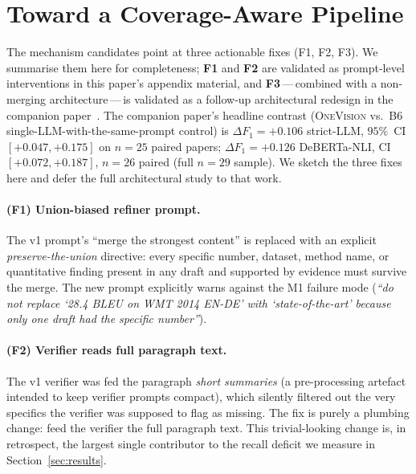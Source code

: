 \documentclass[11pt,a4paper]{article}
\begin{document}
\section{Toward a Coverage-Aware Pipeline}
\label{sec:fix}

The mechanism candidates point at three actionable fixes (F1, F2, F3).
We summarise them here for completeness; \textbf{F1} and \textbf{F2}
are validated as prompt-level interventions in this paper's appendix
material, and \textbf{F3}\,---\,combined with a non-merging
architecture\,---\,is validated as a follow-up architectural redesign
in the companion paper~\cite{sun2026onevision}. The companion paper's
headline contrast (\textsc{OneVision} vs.\ B6 single-LLM-with-the-same-prompt
control) is $\Delta F_1 = +0.106$ strict-LLM, $95\%$~CI
$[+0.047,+0.175]$ on $n=25$ paired papers; $\Delta F_1 = +0.126$
DeBERTa-NLI, CI~$[+0.072,+0.187]$, $n=26$ paired (full $n=29$
sample). We sketch the three fixes here and
defer the full architectural study to that work.

\paragraph{(F1) Union-biased refiner prompt.}
The v1 prompt's ``merge the strongest content'' is replaced with an
explicit \emph{preserve-the-union} directive: every specific number,
dataset, method name, or quantitative finding present in any draft and
supported by evidence must survive the merge. The new prompt explicitly
warns against the M1 failure mode (\textit{``do not replace `28.4 BLEU
on WMT 2014 EN-DE' with `state-of-the-art' because only one draft had
the specific number''}).

\paragraph{(F2) Verifier reads full paragraph text.}
The v1 verifier was fed the paragraph \emph{short summaries} (a
pre-processing artefact intended to keep verifier prompts compact),
which silently filtered out the very specifics the verifier was
supposed to flag as missing. The fix is purely a plumbing change:
feed the verifier the full paragraph text. This trivial-looking
change is, in retrospect, the largest single contributor to the
recall deficit we measure in Section~\ref{sec:results}.
\end{document}
